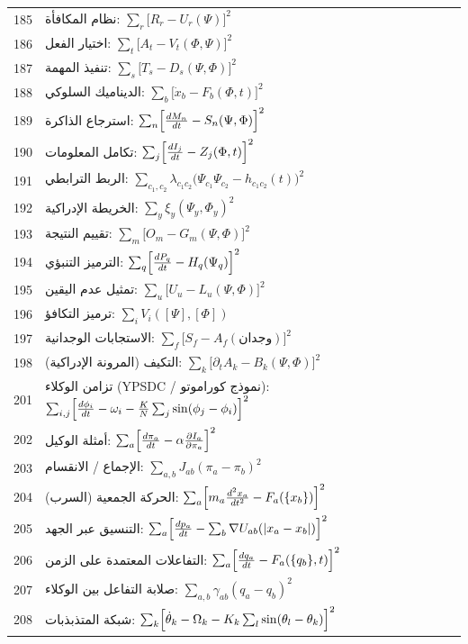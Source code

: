 \documentclass[11pt,a4paper]{article}
\begin{document}
\begin{longtable}{r l}
		185 & نظام المكافأة: $\sum_r\bigl[R_r - U_r(\Psi)\bigr]^2$ \\
		186 & اختيار الفعل: $\sum_t\bigl[A_t - V_t(\Phi,\Psi)\bigr]^2$ \\
		187 & تنفيذ المهمة: $\sum_s\bigl[T_s - D_s(\Psi,\Phi)\bigr]^2$ \\
		188 & الديناميك السلوكي: $\sum_b\bigl[\dot x_b - F_b(\Phi,t)\bigr]^2$ \\
		189 & استرجاع الذاكرة: $\sum_n\Bigl[\frac{dM_n}{dt} - S_n(\Psi,\Phi)\Bigr]^2$ \\
		190 & تكامل المعلومات: $\sum_j\Bigl[\frac{dI_j}{dt} - Z_j(\Phi,t)\Bigr]^2$ \\
		191 & الربط الترابطي: $\sum_{c_1,c_2}\lambda_{c_1c_2}\bigl(\Psi_{c_1}\Psi_{c_2} - h_{c_1c_2}(t)\bigr)^2$ \\
		192 & الخريطة الإدراكية: $\sum_y\xi_y(\Psi_y,\Phi_y)^2$ \\
		193 & تقييم النتيجة: $\sum_m\bigl[O_m - G_m(\Psi,\Phi)\bigr]^2$ \\
		194 & الترميز التنبؤي: $\sum_q\Bigl[\frac{dP_q}{dt} - H_q(\Psi_q)\Bigr]^2$ \\
		195 & تمثيل عدم اليقين: $\sum_u\bigl[U_u - L_u(\Psi,\Phi)\bigr]^2$ \\
		196 & ترميز التكافؤ: $\sum_i V_i([\Psi],[\Phi])$ \\
		197 & الاستجابات الوجدانية: $\sum_f\bigl[S_f - A_f(\text{وجدان})\bigr]^2$ \\
		198 & التكيف (المرونة الإدراكية): $\sum_k\bigl[\partial_t A_k - B_k(\Psi,\Phi)\bigr]^2$ \\
		201 & تزامن الوكلاء (YPSDC / نموذج كوراموتو): $\sum_{i,j}\Bigl[\frac{d\phi_i}{dt} - \omega_i - \frac{K}{N}\sum_j\sin(\phi_j-\phi_i)\Bigr]^2$ \\
		202 & أمثلة الوكيل: $\sum_a\Bigl[\frac{d\pi_a}{dt} - \alpha\frac{\partial I_a}{\partial\pi_a}\Bigr]^2$ \\
		203 & الإجماع / الانقسام: $\sum_{a,b}J_{ab}(\pi_a - \pi_b)^2$ \\
		204 & الحركة الجمعية (السرب): $\sum_a\Bigl[m_a\frac{d^2 x_a}{dt^2} - F_a(\{x_b\})\Bigr]^2$ \\
		205 & التنسيق عبر الجهد: $\sum_a\Bigl[\frac{dp_a}{dt} - \sum_b\nabla U_{ab}(|x_a-x_b|)\Bigr]^2$ \\
		206 & التفاعلات المعتمدة على الزمن: $\sum_a\Bigl[\frac{dq_a}{dt} - F_a(\{q_b\},t)\Bigr]^2$ \\
		207 & صلابة التفاعل بين الوكلاء: $\sum_{a,b}\gamma_{ab}(q_a - q_b)^2$ \\
		208 & شبكة المتذبذبات: $\sum_k\Bigl[\dot\theta_k - \Omega_k - K_k\sum_l\sin(\theta_l-\theta_k)\Bigr]^2$ \\

\end{longtable}
\end{document}
